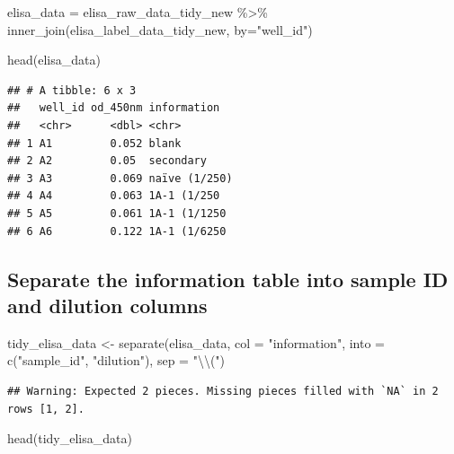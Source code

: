 \documentclass[
]{book}
\newenvironment{Shaded}{\begin{snugshade}}{\end{snugshade}}
\newcommand{\AttributeTok}[1]{\textcolor[rgb]{0.77,0.63,0.00}{#1}}
\newcommand{\FunctionTok}[1]{\textcolor[rgb]{0.00,0.00,0.00}{#1}}
\newcommand{\NormalTok}[1]{#1}
\newcommand{\OtherTok}[1]{\textcolor[rgb]{0.56,0.35,0.01}{#1}}
\newcommand{\SpecialCharTok}[1]{\textcolor[rgb]{0.00,0.00,0.00}{#1}}
\newcommand{\StringTok}[1]{\textcolor[rgb]{0.31,0.60,0.02}{#1}}
\begin{document}
\begin{Shaded}
\begin{Highlighting}[]
\NormalTok{elisa\_data }\OtherTok{=}\NormalTok{ elisa\_raw\_data\_tidy\_new }\SpecialCharTok{\%\textgreater{}\%} \FunctionTok{inner\_join}\NormalTok{(elisa\_label\_data\_tidy\_new, }\AttributeTok{by=}\StringTok{"well\_id"}\NormalTok{)}

\FunctionTok{head}\NormalTok{(elisa\_data)}
\end{Highlighting}
\end{Shaded}

\begin{verbatim}
## # A tibble: 6 x 3
##   well_id od_450nm information  
##   <chr>      <dbl> <chr>        
## 1 A1         0.052 blank        
## 2 A2         0.05  secondary    
## 3 A3         0.069 naïve (1/250)
## 4 A4         0.063 1A-1 (1/250  
## 5 A5         0.061 1A-1 (1/1250 
## 6 A6         0.122 1A-1 (1/6250
\end{verbatim}

\hypertarget{separate-the-information-table-into-sample-id-and-dilution-columns}{%
\subsection{Separate the information table into sample ID and dilution columns}\label{separate-the-information-table-into-sample-id-and-dilution-columns}}

\begin{Shaded}
\begin{Highlighting}[]
\NormalTok{tidy\_elisa\_data }\OtherTok{\textless{}{-}} \FunctionTok{separate}\NormalTok{(elisa\_data, }\AttributeTok{col =} \StringTok{"information"}\NormalTok{, }\AttributeTok{into =} \FunctionTok{c}\NormalTok{(}\StringTok{"sample\_id"}\NormalTok{, }\StringTok{"dilution"}\NormalTok{), }\AttributeTok{sep =} \StringTok{"}\SpecialCharTok{\textbackslash{}\textbackslash{}}\StringTok{("}\NormalTok{)}
\end{Highlighting}
\end{Shaded}

\begin{verbatim}
## Warning: Expected 2 pieces. Missing pieces filled with `NA` in 2 rows [1, 2].
\end{verbatim}

\begin{Shaded}
\begin{Highlighting}[]
\FunctionTok{head}\NormalTok{(tidy\_elisa\_data)}
\end{Highlighting}
\end{Shaded}
\end{document}
